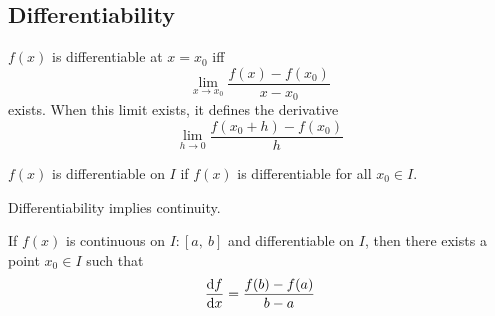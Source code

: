 \documentclass{article}
\begin{document}
\subsection{Differentiability}
\begin{theorem}[Differentiability]
    $f(x)$ is differentiable at $x=x_0$ iff
    \begin{equation*}
        \lim_{x\to x_0} \frac{f(x)-f(x_0)}{x-x_0}
    \end{equation*}
    exists. When this limit exists, it defines the derivative
    \begin{equation*}
        \lim_{h\to 0} \frac{f(x_0+h)-f(x_0)}{h}
    \end{equation*}
\end{theorem}
\begin{theorem}
    $f(x)$ is differentiable on $I$ if $f(x)$ is differentiable for all $x_0\in I$.
\end{theorem}
\begin{theorem}
    Differentiability implies continuity.
\end{theorem}
\begin{theorem}
    If $f(x)$ is continuous on $I:\left[ a,\:b \right]$ and differentiable on $I$, then there exists a point $x_0\in I$ such that
    \begin{equation*}
        \dv{f}{x}(x_0)=\frac{f(b)-f(a)}{b-a}
    \end{equation*}
\end{theorem}
\newpage
\end{document}
